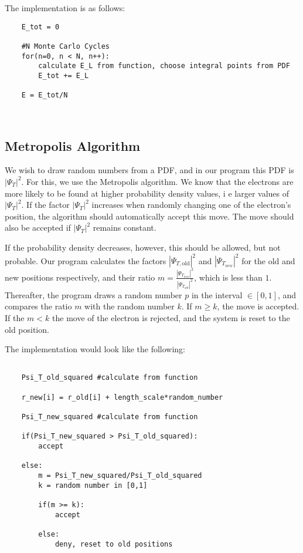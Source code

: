 \documentclass[norsk,a4paper,12pt]{article}
\begin{document}
The implementation is as follows:

\begin{lstlisting}
    E_tot = 0
    
    #N Monte Carlo Cycles
    for(n=0, n < N, n++):
        calculate E_L from function, choose integral points from PDF
        E_tot += E_L
        
    E = E_tot/N
        
    
\end{lstlisting}

\subsection{Metropolis Algorithm} \label{MetropolisAlgorithm}
We wish to draw random numbers from a PDF, and in our program this PDF is $|\Psi_T|^2$. For this, we use the Metropolis algorithm. We know that the electrons are more likely to be found at higher probability density values, i e larger values of $|\Psi_T|^2$. If the factor $|\Psi_T|^2$ increases when randomly changing one of the electron's position, the algorithm should automatically accept this move. The move should also be accepted if $|\Psi_T|^2$ remains constant.

\par 
\vspace{2mm}

If the probability density decreases, however, this should be allowed, but not probable. Our program calculates the factors $|\Psi_{T,\text{old}}|^2$ and $|\Psi_{T_{new}}|^2$ for the old and new positions respectively, and their ratio $ m = \frac{|\Psi_{T_{new}}|^2}{|\Psi_{T_{old}}|^2}$, which is less than $1$. Thereafter, the program draws a random number $p$ in the interval $\in [0, 1]$, and compares the ratio $m$ with the random number $k$. If $m \geq k$, the move is accepted. If the $m < k$ the move of the electron is rejected, and the system is reset to the old position. 

\par 
\vspace{3mm}

The implementation would look like the following:

\begin{lstlisting}
    
    Psi_T_old_squared #calculate from function
    
    r_new[i] = r_old[i] + length_scale*random_number
    
    Psi_T_new_squared #calculate from function
    
    if(Psi_T_new_squared > Psi_T_old_squared):
        accept
    
    else:
        m = Psi_T_new_squared/Psi_T_old_squared
        k = random number in [0,1]
        
        if(m >= k):
            accept
            
        else:
            deny, reset to old positions
    
    
    
    
\end{lstlisting}
\end{document}
